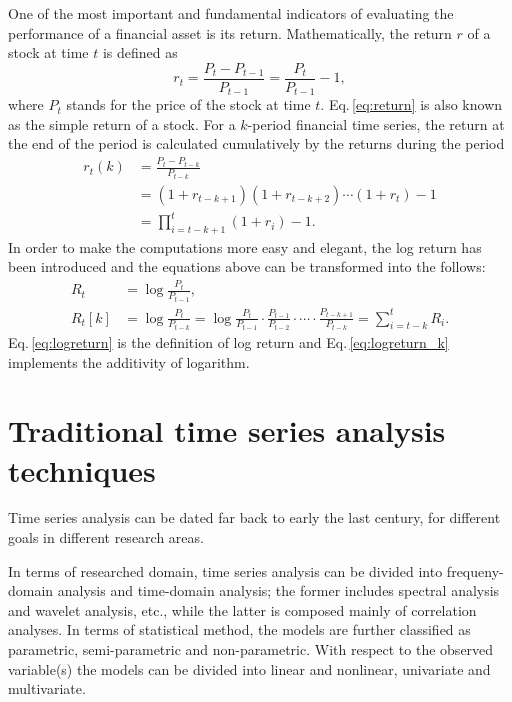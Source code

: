 One of the most important and fundamental indicators of 
evaluating the performance of a financial asset is its return.
Mathematically, the return $r$ of a stock at time $t$ is defined as
		\begin{equation}
		\label{eq:return}
		r_t = \frac{P_{t} - P_{t-1}}{P_{t-1}} = \frac{P_{t}}{P_{t-1}} - 1,
		\end{equation}
where $P_t$ stands for the price of the stock at time $t$.
Eq.\,\ref{eq:return} is also known as the simple return of a stock.
For a $k$-period financial time series,
the return at the end of the period is calculated cumulatively by the returns during the period
		\begin{equation}
		\label{eq:return_k}
		\begin{aligned}
		r_t(k) & = \frac{P_{t} - P_{t-k}}{P_{t-k}} \\
		& = (1 + r_{t-k+1})(1 + r_{t-k+2})\cdots(1 + r_{t}) - 1 \\
		& = \prod_{i=t-k+1}^{t}(1 + r_i) - 1.
		\end{aligned}
		\end{equation}
In order to make the computations more easy and elegant,
the log return has been introduced and the equations above can be transformed into the follows:
		\begin{subequations}
		\begin{align}
		\label{eq:logreturn}
		R_t & = \log\frac{P_{t}}{P_{t-1}}, \\ 
		\label{eq:logreturn_k}
		R_t[k] & = \log\frac{P_{t}}{P_{t-k}} = 
			\log\frac{P_{t}}{P_{t-1}}\cdot\frac{P_{t-1}}{P_{t-2}}
			\cdot\cdots\cdot\frac{P_{t-k+1}}{P_{t-k}} = 
			\sum_{i=t-k}^{t} R_i.
		\end{align}
		\end{subequations}
Eq.\,\ref{eq:logreturn} is the definition of log return and 
Eq.\,\ref{eq:logreturn_k} implements the additivity of logarithm.


\section{Traditional time series analysis techniques}
\label{sec:introduction:technique}
Time series analysis can be dated far back to early the last century,
for different goals in different research areas.

In terms of researched domain, 
time series analysis can be divided into frequeny-domain analysis and time-domain analysis;
the former includes spectral analysis and wavelet analysis, etc., 
while the latter is composed mainly of correlation analyses.
In terms of statistical method,
the models are further classified as parametric, semi-parametric and non-parametric.
With respect to the observed variable(s) the models can be divided into 
linear and nonlinear, univariate and multivariate. 

